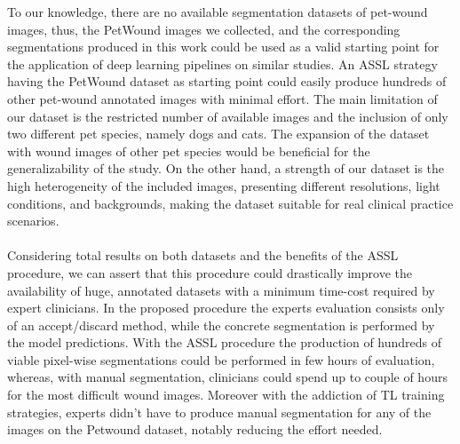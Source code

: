\documentclass[../main.tex]{subfiles}
\begin{document}
To our knowledge, there are no available segmentation datasets of pet-wound images, thus, the PetWound images we collected, and the corresponding segmentations produced in this work could be used as a valid starting point for the application of deep learning pipelines on similar studies. An ASSL strategy having the PetWound dataset as starting point could easily produce hundreds of other pet-wound annotated images with minimal effort.
The main limitation of our dataset is the restricted number of available images and the inclusion of only two different pet species, namely dogs and cats. The expansion of the dataset with wound images of other pet species would be beneficial for the generalizability of the study. On the other hand, a strength of our dataset is the high heterogeneity of the included images, presenting different resolutions, light conditions, and backgrounds, making the dataset suitable for real clinical practice scenarios.
\\
\\
Considering total results on both datasets and the benefits of the ASSL procedure, we can assert that this procedure could drastically improve the availability of huge, annotated datasets with a minimum time-cost required by expert clinicians. 
In the proposed procedure the experts evaluation consists only of an accept/discard method, while the concrete segmentation is performed by the model predictions.
With the ASSL procedure the production of hundreds of viable pixel-wise segmentations could be performed in few hours of evaluation, whereas, with manual segmentation, clinicians could spend up to couple of hours for the most difficult wound images.
Moreover with the addiction of TL training strategies, experts didn't have to produce manual segmentation for any of the images on the Petwound dataset, notably reducing the effort needed. 
\end{document}
